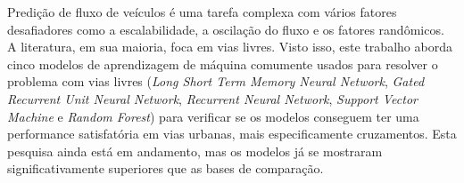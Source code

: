 Predição de fluxo de veículos é uma tarefa complexa com vários fatores desafiadores como a escalabilidade, a oscilação do fluxo e os fatores randômicos. A literatura, em sua maioria, foca em vias livres. Visto isso, este trabalho aborda cinco modelos de aprendizagem de máquina comumente usados para resolver o problema com vias livres (\textit{Long Short Term Memory Neural Network}, \textit{Gated Recurrent Unit Neural Network}, \textit{Recurrent Neural Network}, \textit{Support Vector Machine} e \textit{Random Forest}) para verificar se os modelos conseguem ter uma performance satisfatória em vias urbanas, mais especificamente cruzamentos. Esta pesquisa ainda está em andamento, mas os modelos já se mostraram significativamente superiores que as bases de comparação.